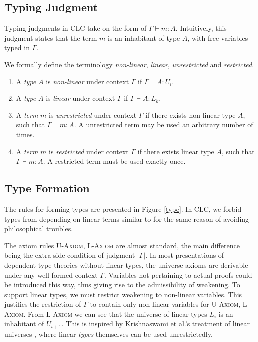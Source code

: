 \documentclass[sigplan,screen,review,authordraft]{acmart}
\newcommand{\rname}[1]{\textsc{\footnotesize #1}}
\newcommand{\pure}[1]{|#1|}
\begin{document}
\subsection{Typing Judgment}
Typing judgments in CLC take on the form of $\Gamma \vdash m : A$. Intuitively, this judgment states that the term $m$ is an inhabitant of type $A$, with free variables typed in $\Gamma$.

\begin{definition} We formally define the terminology \textit{non-linear}, \textit{linear}, \textit{unrestricted} and \textit{restricted}.
  \begin{enumerate}
    \item A \textit{type} $A$ is \textit{non-linear} under context $\Gamma$ if $\Gamma \vdash A : U_i$.
    \item A \textit{type} $A$ is \textit{linear} under context $\Gamma$ if $\Gamma \vdash A : L_k$.
    \item A \textit{term} $m$ is \textit{unrestricted} under context $\Gamma$ if there exists non-linear type $A$, such that $\Gamma \vdash m : A$. A unrestricted term may be used an arbitrary number of times.
    \item A \textit{term} $m$ is \textit{restricted} under context $\Gamma$ if there exists linear type $A$, such that $\Gamma \vdash m : A$. A restricted term must be used exactly once.
  \end{enumerate}
\end{definition}

\subsection{Type Formation} \label{tyformation}
The rules for forming types are presented in Figure \ref{type}. In CLC, we forbid types from depending on linear terms similar to \cite{llf,neel15} for the same reason of avoiding philosophical troubles.

The axiom rules \rname{U-Axiom}, \rname{L-Axiom} are almost standard, the main difference being the extra side-condition of judgment $\pure{\Gamma}$. In most presentations of dependent type theories without linear types, the universe axioms are derivable under any well-formed context $\Gamma$. Variables not pertaining to actual proofs could be introduced this way, thus giving rise to the admissibility of weakening. To support linear types, we must restrict weakening to non-linear variables. This justifies the restriction of $\Gamma$ to contain only non-linear variables for \rname{U-Axiom}, \rname{L-Axiom}. From \rname{L-Axiom} we can see that the universe of linear types $L_i$ is an inhabitant of $U_{i+1}$. This is inspired by Krishnaswami et al.'s treatment of linear universes \cite{neel15}, where linear \textit{types} themselves can be used unrestrictedly.
\end{document}
